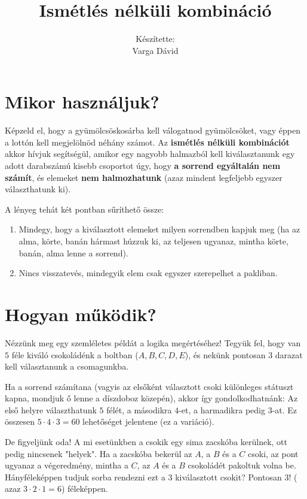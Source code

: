 \documentclass[a4paper,12pt]{article}
\title{Ismétlés nélküli kombináció}
\author{Készítette: \\Varga Dávid}
\theoremstyle{definition} %
\begin{document}
\maketitle

\section{Mikor használjuk?}
Képzeld el, hogy a gyümölcsöskosárba kell válogatnod gyümölcsöket, vagy éppen a lottón kell megjelölnöd néhány számot. Az \textbf{ismétlés nélküli kombinációt} akkor hívjuk segítségül, amikor egy nagyobb halmazból kell kiválasztanunk egy adott darabszámú kisebb csoportot úgy, hogy \textbf{a sorrend egyáltalán nem számít}, és elemeket \textbf{nem halmozhatunk} (azaz mindent legfeljebb egyszer választhatunk ki). 

A lényeg tehát két pontban sűríthető össze: 
\begin{enumerate}
    \item Mindegy, hogy a kiválasztott elemeket milyen sorrendben kapjuk meg (ha az alma, körte, banán hármast húzzuk ki, az teljesen ugyanaz, mintha körte, banán, alma lenne a sorrend).
    \item Nincs visszatevés, mindegyik elem csak egyszer szerepelhet a pakliban.
\end{enumerate}

\section{Hogyan működik?}
Nézzünk meg egy szemléletes példát a logika megértéséhez! Tegyük fel, hogy van $5$ féle kiváló csokoládénk a boltban ($A, B, C, D, E$), és nekünk pontosan $3$ darazat kell választanunk a csomagunkba. 

Ha a sorrend számítana (vagyis az elsőként választott csoki különleges státuszt kapna, mondjuk ő lenne a díszdoboz közepén), akkor így gondolkodhatnánk:
Az első helyre választhatunk $5$ félét, a másodikra $4$-et, a harmadikra pedig $3$-at. Ez összesen $5 \cdot 4 \cdot 3 = 60$ lehetőséget jelentene (ez a variáció).

De figyeljünk oda! A mi esetünkben a csokik egy sima zacskóba kerülnek, ott pedig nincsenek "helyek". Ha a zacskóba bekerül az $A$, a $B$ és a $C$ csoki, az pont ugyanaz a végeredmény, mintha a $C$, az $A$ és a $B$ csokoládét pakoltuk volna be. Hányféleképpen tudjuk sorba rendezni ezt a $3$ kiválasztott csokit? Pontosan $3!$ ( azaz $3 \cdot 2 \cdot 1 = 6$) féleképpen. 
\end{document}
